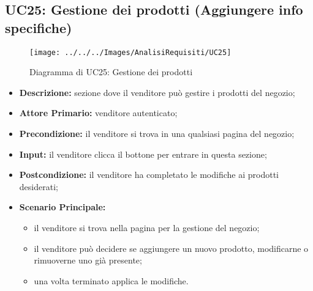 \subsection{UC25: Gestione dei prodotti (\textbf{Aggiungere info specifiche})}
\label{sec:UC25}
\begin{figure}[!ht]
    \caption{Diagramma di UC25: Gestione dei prodotti}
    \vspace{10px}
    \texttt{[image: ../../../Images/AnalisiRequisiti/UC25]}
    \centering
\end{figure}
\begin{itemize}
    \item \textbf{Descrizione:} sezione dove il venditore può gestire i prodotti del negozio;
    \item \textbf{Attore Primario:} venditore autenticato;
    \item \textbf{Precondizione:} il venditore si trova in una qualsiasi pagina del negozio;
    \item \textbf{Input:} il venditore clicca il bottone per entrare in questa sezione;
    \item \textbf{Postcondizione:} il venditore ha completato le modifiche ai prodotti desiderati;
    \item \textbf{Scenario Principale:}
          \begin{itemize}
              \item il venditore si trova nella pagina per la gestione del negozio;
              \item il venditore può decidere se aggiungere un nuovo prodotto, modificarne o rimuoverne uno già presente;
              \item una volta terminato applica le modifiche.
          \end{itemize}
\end{itemize}
